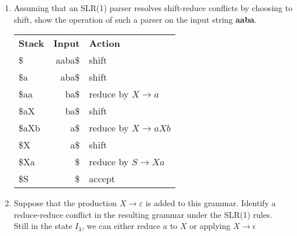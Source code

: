 \documentclass[10pt]{article}
\begin{document}
\begin{enumerate}
\begin{enumerate}
\item Assuming that an SLR(1) parser resolves shift-reduce conflicts
by choosing to shift, show the operation of such a parser on the input
string \textbf{aaba}.
\begin{center}\begin{tabular}{l|r|l}
\textbf{Stack} & \textbf{Input} & \textbf{Action} \\
\$ & aaba\$ & shift \\
\$a & aba\$ & shift \\
\$aa & ba\$ & reduce by $X\rightarrow a$ \\
\$aX & ba\$ & shift \\
\$aXb & a\$ & reduce by $X\rightarrow aXb$ \\
\$X & a\$ & shift\\
\$Xa & \$ & reduce by $S\rightarrow Xa$ \\
\$S & \$ &  accept\\
\end{tabular}\end{center}
\item Suppose that the production $X \rightarrow \varepsilon$ is added
to this grammar.  Identify a reduce-reduce conflict in the resulting
grammar under the SLR(1) rules.\\
Still in the state $I_3$, we can either reduce $a$ to $X$ or applying $X\rightarrow \epsilon$\\

\end{enumerate}
\end{enumerate}
\end{document}
